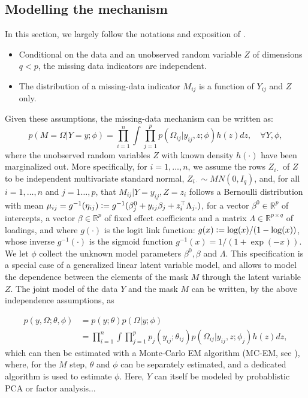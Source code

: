 \documentclass{article}
\begin{document}
\subsection{Modelling the mechanism}
In this section, we largely follow the notations and exposition of \textcite{sportisse_imputation_2020}.
\begin{itemize}
    \item Conditional on the data and an unobserved random variable $Z$ of dimensions $q<p$, the missing data indicators are independent.
    \item The distribution of a missing-data indicator $M_{ij}$ is a function of $Y_{ij}$ and $Z$ only.
\end{itemize}
Given these assumptions, the missing-data mechanism can be written as:
%
\begin{equation}
    p(M = \Omega | Y=y; \phi) = \prod_{i=1}^n \int \prod_{j=1}^p p(\Omega_{ij} | y_{ij}, z; \phi) h(z) dz, \quad \forall Y, \phi,
\end{equation}
%
where the unobserved random variables $Z$ with known density $h(\cdot)$ have been marginalized out. More specifically, for $i=1, \dots, n$, we assume the rows $Z_{i\cdot}$ of $Z$ to be independent multivariate standard normal, $Z_{i\cdot}\sim MN(0, I_q)$, and, for all $i=1, \dots, n$ and $j=1\dots, p$, that $M_{ij} | Y=y_{ij}, Z=z_i$ follows a Bernoulli distribution with mean $\mu_{ij} = g^{-1}(\eta_{ij})\vcentcolon = g^{-1}(\beta_j^0 + y_{ij}\beta_j + z_i^\top\Lambda_{j\cdot})$, for a vector $\beta^0\in\mathbb R^p$ of intercepts, a vector $\beta\in\mathbb R^p$ of fixed effect coefficients and a matrix $\Lambda\in\mathbb R^{p\times q}$ of loadings, and where $g(\cdot)$ is the logit link function: $g(x) \vcentcolon= \log(x)/(1-\log(x))$, whose inverse $g^{-1}(\cdot)$ is the sigmoid function $g^{-1}(x) = 1/(1+ \exp(-x))$. We let $\phi$ collect the unknown model parameters $\beta^0, \beta$ and $\Lambda$.
This specification is a special case of a generalized linear latent variable model, and allows to model the dependence between the elements of the mask $M$ through the latent variable $Z$. The joint model of the data $Y$ and the mask $M$ can be written, by the above independence assumptions, as

\begin{align}
    p(y, \Omega;\theta, \phi) &= p(y; \theta) p(\Omega|y; \phi)\\
    &= \prod_{i=1}^n \int \prod_{j=1}^p p_j(y_{ij}; \theta_{ij})p(\Omega_{ij} | y_{ij}, z; \phi_j) h(z) dz,
\end{align}
%
which can then be estimated with a Monte-Carlo EM algorithm (MC-EM, see \cite{sportisse_imputation_2020}), where, for the $M$ step, $\theta$ and $\phi$ can be separately estimated, and a dedicated algorithm is used to estimate $\phi$. Here, $Y$ can itself be modeled by probablistic PCA or factor analysis...
\end{document}
